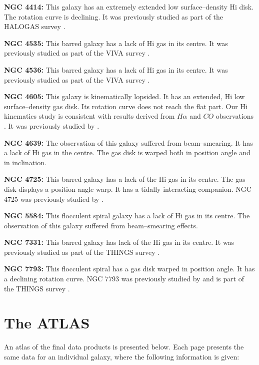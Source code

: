 \documentclass[usenatbib,useAMS]{mnras}
\begin{document}
\textbf{NGC 4414:} This galaxy has an extremely extended low
surface--density H{\sc i} disk.  The rotation curve is declining.  It
was previously studied as part of the HALOGAS survey \citep{ngc4414,
halogas}. 
    
\textbf{NGC 4535:} This barred galaxy has a lack of H{\sc i} gas in its
centre.  It was previously studied as part of the VIVA survey
\citep{viva}. 
    
\textbf{NGC 4536:} This barred galaxy has a lack of H{\sc i} gas in its
centre.  It was previously studied as part of the VIVA survey
\citep{viva}. 
    
\textbf{NGC 4605:} This galaxy is kinematically lopsided.  It has an
extended, H{\sc i} low surface--density gas disk.  Its rotation curve
does not reach the flat part.  Our H{\sc i} kinematics study is
consistent with results derived from $H\alpha$ and $CO$ observations
\citep{simon05}.  It was previously studied by \citet{broeils92}. 
   
\textbf{NGC 4639:} The observation of this galaxy suffered from
beam--smearing.  It has a lack of H{\sc i} gas in the centre.  The gas
disk is warped both in position angle and in inclination. 
   
\textbf{NGC 4725:} This barred galaxy has a lack of the H{\sc i} gas in
its centre.  The gas disk displays a position angle warp.  It has a
tidally interacting companion.  NGC 4725 was previously studied by
\citet{ngc4725}. 
   
\textbf{NGC 5584:} This flocculent spiral galaxy has a lack of H{\sc i}
gas in its centre.  The observation of this galaxy suffered from
beam--smearing effects. 
   
\textbf{NGC 7331:} This barred galaxy has lack of the H{\sc i} gas in
its centre.  It was previously studied as part of the THINGS survey
\citep{deblok08, things}. 
   
\textbf{NGC 7793:} This flocculent spiral has a gas disk warped in
position angle.  It has a declining rotation curve.  NGC 7793 was
previously studied by \citet{ngc7793} and is part of the THINGS survey
\citep{deblok08, things}. 
   
   
   
 
\section{The ATLAS}

An atlas of the final data products is presented below.  Each page
presents the same data for an individual galaxy, where the following
information is given:
\end{document}
